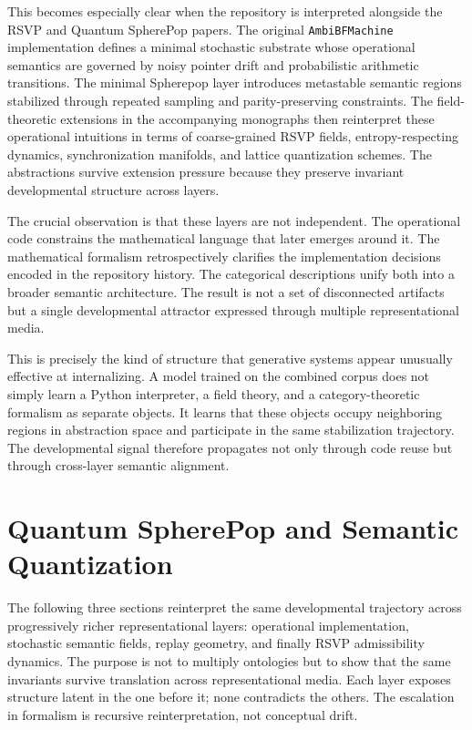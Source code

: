 \documentclass[11pt]{article}
\begin{document}
This becomes especially clear when the repository is interpreted alongside the
RSVP and Quantum SpherePop papers. The original \texttt{AmbiBFMachine}
implementation defines a minimal stochastic substrate whose operational semantics
are governed by noisy pointer drift and probabilistic arithmetic transitions.
The minimal Spherepop layer introduces metastable semantic regions stabilized
through repeated sampling and parity-preserving constraints. The field-theoretic
extensions in the accompanying monographs then reinterpret these operational
intuitions in terms of coarse-grained RSVP fields, entropy-respecting dynamics,
synchronization manifolds, and lattice quantization schemes. The abstractions
survive extension pressure because they preserve invariant developmental
structure across layers.

The crucial observation is that these layers are not independent. The operational
code constrains the mathematical language that later emerges around it. The
mathematical formalism retrospectively clarifies the implementation decisions
encoded in the repository history. The categorical descriptions unify both into
a broader semantic architecture. The result is not a set of disconnected
artifacts but a single developmental attractor expressed through multiple
representational media.

This is precisely the kind of structure that generative systems appear unusually
effective at internalizing. A model trained on the combined corpus does not
simply learn a Python interpreter, a field theory, and a category-theoretic
formalism as separate objects. It learns that these objects occupy neighboring
regions in abstraction space and participate in the same stabilization
trajectory. The developmental signal therefore propagates not only through code
reuse but through cross-layer semantic alignment.

\section{Quantum SpherePop and Semantic Quantization}

The following three sections reinterpret the same developmental trajectory
across progressively richer representational layers: operational implementation,
stochastic semantic fields, replay geometry, and finally RSVP admissibility
dynamics. The purpose is not to multiply ontologies but to show that the same
invariants survive translation across representational media. Each layer
exposes structure latent in the one before it; none contradicts the others.
The escalation in formalism is recursive reinterpretation, not conceptual drift.
\end{document}
